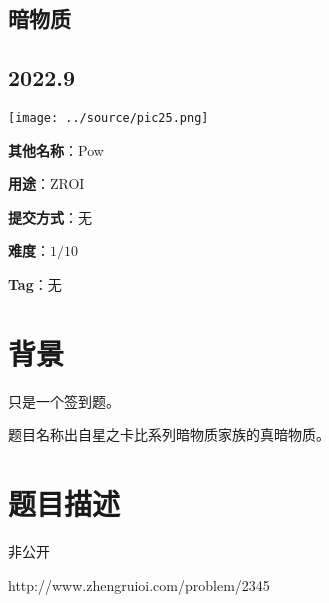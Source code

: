 \documentclass[a4paper,10pt]{article}
\begin{document}
\vspace*{\fill}
\begin{center}

\section{暗物质}

\subsection*{2022.9}

\vspace{10pt}

\texttt{[image: ../source/pic25.png]}

\vspace{10pt}

\textbf{其他名称}：Pow

\vspace{10pt}

\textbf{用途}：ZROI

\vspace{10pt}

\textbf{提交方式}：无

\vspace{10pt}

\textbf{难度}：$1/10$

\vspace{10pt}

\textbf{Tag}：无

\end{center}
\vspace*{\fill}

\newpage

\section*{背景}

只是一个签到题。

题目名称出自星之卡比系列暗物质家族的真暗物质。

\section*{题目描述}

非公开

http://www.zhengruioi.com/problem/2345

\newpage
\end{document}

